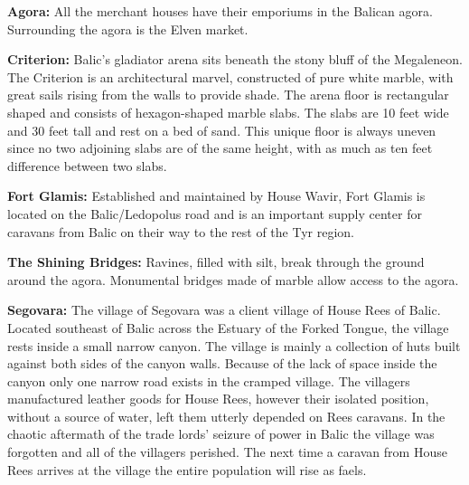 {
	\textbf{Agora:} All the merchant houses have their emporiums in the Balican agora. Surrounding the agora is the Elven market.

	\textbf{Criterion:} Balic's gladiator arena sits beneath the stony bluff of the Megaleneon. The Criterion is an architectural marvel, constructed of pure white marble, with great sails rising from the walls to provide shade. The arena floor is rectangular shaped and consists of hexagon-shaped marble slabs. The slabs are 10 feet wide and 30 feet tall and rest on a bed of sand. This unique floor is always uneven since no two adjoining slabs are of the same height, with as much as ten feet difference between two slabs.

	\textbf{Fort Glamis:} Established and maintained by House Wavir, Fort Glamis is located on the Balic/Ledopolus road and is an important supply center for caravans from Balic on their way to the rest of the Tyr region.

	\textbf{The Shining Bridges:} Ravines, filled with silt, break through the ground around the agora. Monumental bridges made of marble allow access to the agora.

	\textbf{Segovara:} The village of Segovara was a client village of House Rees of Balic. Located southeast of Balic across the Estuary of the Forked Tongue, the village rests inside a small narrow canyon. The village is mainly a collection of huts built against both sides of the canyon walls. Because of the lack of space inside the canyon only one narrow road exists in the cramped village. The villagers manufactured leather goods for House Rees, however their isolated position, without a source of water, left them utterly depended on Rees caravans. In the chaotic aftermath of the trade lords' seizure of power in Balic the village was forgotten and all of the villagers perished. The next time a caravan from House Rees arrives at the village the entire population will rise as faels.
}

